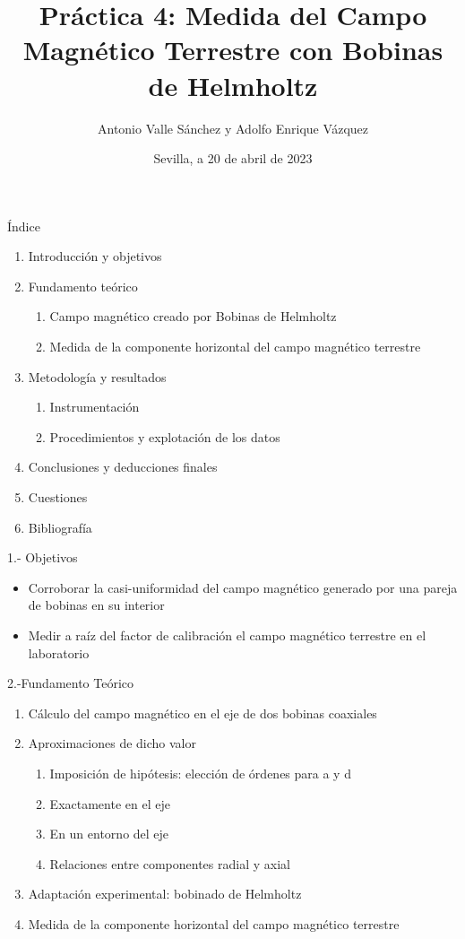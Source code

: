 \documentclass{beamer}
\title{Práctica 4: Medida del Campo Magnético Terrestre con Bobinas de Helmholtz}
\author{Antonio Valle Sánchez y Adolfo Enrique Vázquez}
\date{Sevilla, a 20 de abril de 2023}
\begin{document}
\maketitle
\begin{frame}{Índice}
\begin{enumerate}
    \item Introducción y objetivos
    \item Fundamento teórico
    \begin{enumerate}[label*=\arabic*.]
        \item Campo magnético creado por Bobinas de Helmholtz
        \item Medida de la componente horizontal del campo magnético terrestre
    \end{enumerate}
    \item Metodología y resultados
    \begin{enumerate}[label*=\arabic*.]
        \item Instrumentación
        \item Procedimientos y explotación de los datos
    \end{enumerate}
    \item Conclusiones y deducciones finales
    \item Cuestiones
    \item Bibliografía
\end{enumerate}
\end{frame}
\begin{frame}{1.- Objetivos}
\begin{itemize}
\item Corroborar la casi-uniformidad del campo magnético generado por una pareja de bobinas en su interior
\item Medir a raíz del factor de calibración el campo magnético terrestre en el laboratorio
\end{itemize}
\end{frame}
\begin{frame}{2.-Fundamento Teórico}
\begin{enumerate}
    \item Cálculo del campo magnético en el eje de dos bobinas coaxiales
    \item Aproximaciones de dicho valor
    \begin{enumerate}[label*=\arabic*.]
        \item Imposición de hipótesis: elección de órdenes para a y d
        \item Exactamente en el eje
        \item En un entorno del eje
        \item Relaciones entre componentes radial y axial
    \end{enumerate}
    \item Adaptación experimental: bobinado de Helmholtz
    \item Medida de la componente horizontal del campo magnético terrestre
\end{enumerate}
\end{frame}
\end{document}
